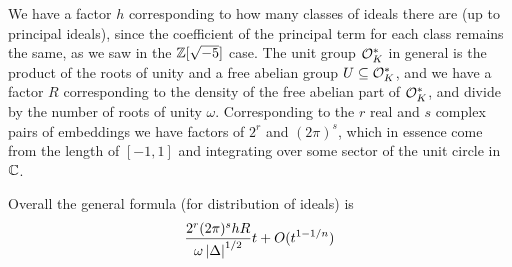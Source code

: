 \documentclass[11pt]{article}
\begin{document}
We have a factor $h$ corresponding to how many classes of ideals there are (up to principal ideals), since the coefficient of the principal term for each class remains the same, as we saw in the $\mathbb{Z}[\sqrt{-5}]$ case. The unit group $\mathcal{O}_K^*$ in general is the product of the roots of unity and a free abelian group $U \subseteq \mathcal{O}_K^*$, and we have a factor $R$ corresponding to the density of the free abelian part of $\mathcal{O}_K^*$, and divide by the number of roots of unity $\omega$. Corresponding to the $r$ real and $s$ complex pairs of embeddings we have factors of $2^r$ and $(2\pi)^s$, which in essence come from the length of $[-1, 1]$ and integrating over some sector of the unit circle in $\mathbb{C}$.

Overall the general formula (for distribution of ideals) is
$$
    \frac{2^r(2\pi)^shR}{\omega\left| \Delta \right|^{1/2}}t + O(t^{1 - 1/n})
$$
\end{document}
